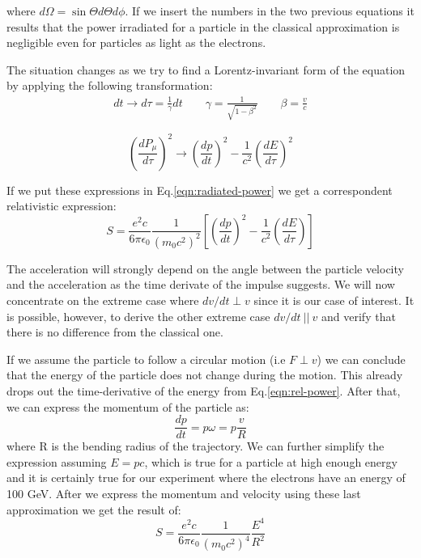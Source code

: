 where $d\Omega = \sin{\Theta} d\Theta d\phi$. If we insert the numbers in the two previous equations it results that the power irradiated for a particle in the classical approximation is negligible even for particles as light as the electrons.

The situation changes as we try to find a Lorentz-invariant form of the equation by applying the following transformation:
\begin{eqnarray}
dt \longrightarrow d\tau=\frac{1}{\gamma}dt \qquad
\gamma = \frac{1}{\sqrt{1-\beta^2}} \qquad \beta=\frac{v}{c}
\label{time_trans}
\end{eqnarray}

\begin{equation}
\left(\frac{dP_{\mu}}{d\tau}\right)^2 \longrightarrow \left(\frac{dp}{dt}\right)^2 - \frac{1}{c^2}\left(\frac{dE}{d\tau}\right)^2
\label{momentum-trans}
\end{equation}

If we put these expressions in Eq.\ref{eqn:radiated-power} we get a correspondent relativistic expression:
\begin{equation}
S = \frac{e^2c}{6\pi \epsilon_0}\frac{1}{(m_0c^2)^2 }\left[\left(\frac{dp}{dt}\right)^2 - \frac{1}{c^2}\left(\frac{dE}{d\tau}\right)\right]
\label{eqn:rel-power}
\end{equation}

The acceleration will strongly depend on the angle between the particle velocity and the acceleration as the time derivate of the impulse suggests. We will now concentrate on the extreme case where $dv/dt \perp v$ since it is our case of interest. It is possible, however, to derive the other extreme case $dv/dt~||~v$ and verify that there is no difference from the classical one. \par

If we assume the particle to follow a circular motion (i.e $F \perp v$) we can conclude that the energy of the particle does not change during the motion. This already drops out the time-derivative of the energy from Eq.\ref{eqn:rel-power}. After that, we can express the momentum of the particle as:
\[\frac{dp}{dt} =p\omega = p \frac{v}{R}\]
where R is the bending radius of the trajectory. We can further simplify the expression assuming $E=pc$, which is true for a particle at high enough energy and it is certainly true for our experiment where the electrons have an energy of 100 GeV. After we express the momentum and velocity using these last approximation we get the result of:
\begin{equation}
S = \frac{e^2c}{6\pi \epsilon_0}\frac{1}{(m_0c^2)^4 }\frac{E^4}{R^2}
\end{equation}

